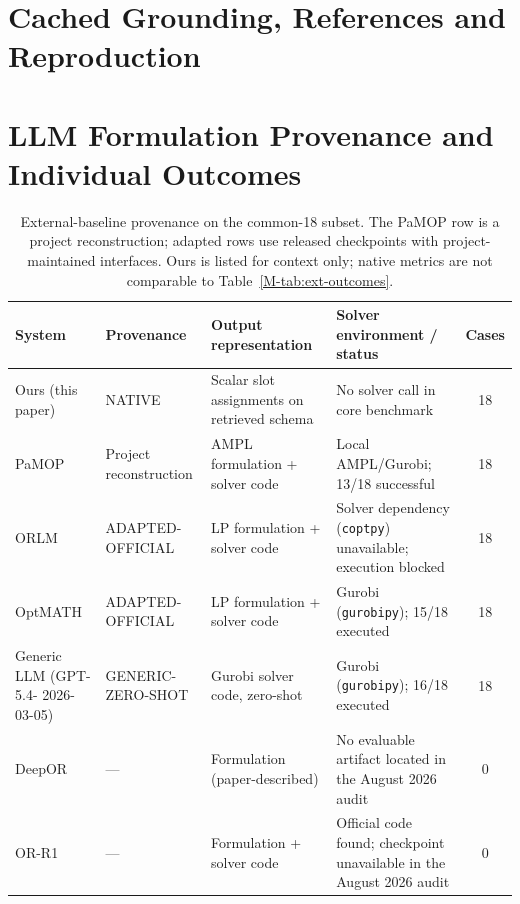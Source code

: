 \documentclass[pdflatex,sn-basic,Numbered]{sn-jnl}
\begin{document}
\section{Cached Grounding, References and Reproduction}
\label{app:grounding-diagnostics}




\FloatBarrier
\section{LLM Formulation Provenance and Individual Outcomes}
\begin{table}[htbp]
  \centering
  \caption{External-baseline provenance on the common-18 subset. The PaMOP row is a project reconstruction; adapted rows use released checkpoints with project-maintained interfaces. Ours is listed for context only; native metrics are not comparable to Table~\ref{M-tab:ext-outcomes}.}
  \label{tab:ext-context}
  \small
  \setlength{\tabcolsep}{3pt}
  \renewcommand{\arraystretch}{1.15}
  \begin{tabular}{@{}>{\raggedright\arraybackslash}p{1.9cm}>{\raggedright\arraybackslash}p{2.6cm}>{\raggedright\arraybackslash}p{2.5cm}>{\raggedright\arraybackslash}p{3.55cm}c@{}}
    \toprule
    System & Provenance & Output representation & Solver environment / status & Cases \\
    \midrule
    Ours (this paper) & NATIVE & Scalar slot assignments on retrieved schema & No solver call in core benchmark & 18 \\
    PaMOP \cite{pan2025pamop} & Project reconstruction & AMPL formulation + solver code & Local AMPL/Gurobi; 13/18 successful & 18 \\
    ORLM \cite{huang2025orlm} & ADAPTED- OFFICIAL & LP formulation + solver code & Solver dependency (\texttt{coptpy}) unavailable; execution blocked & 18 \\
    OptMATH \cite{lu2025optmath} & ADAPTED- OFFICIAL & LP formulation + solver code & Gurobi (\texttt{gurobipy}); 15/18 executed & 18 \\
    Generic LLM (GPT-5.4- 2026-03-05) & GENERIC- ZERO-SHOT & Gurobi solver code, zero-shot & Gurobi (\texttt{gurobipy}); 16/18 executed & 18 \\
    DeepOR \cite{xiao2026deepor} & --- & Formulation (paper-described) & No evaluable artifact located in the August 2026 audit & 0 \\
    OR-R1 \cite{ding2026orr1} & --- & Formulation + solver code & Official code found; checkpoint unavailable in the August 2026 audit & 0 \\
    \bottomrule
  \end{tabular}
\end{table}

\FloatBarrier
\end{document}
